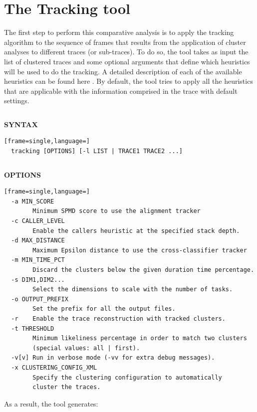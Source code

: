 \documentclass[twoside,a4,english,11pt]{book}
\begin{document}
\section{The Tracking tool}

The first step to perform this comparative analysis is to apply the tracking algorithm to the sequence of 
frames that results from the application of cluster analyses to different traces (or sub-traces).
To do so, the tool takes as input the list of clustered traces and some optional arguments that define
which heuristics will be used to do the tracking. A detailed description of each of the available 
heuristics can be found here \cite{Llort:IPTW14}. By default, the tool tries to apply all the heuristics
that are applicable with the information comprised in the trace with default settings.

\begin{tabular}{c}
 \tabularnewline
\end{tabular}

\textbf{SYNTAX}
\begin{lstlisting}[frame=single,language=]
  tracking [OPTIONS] [-l LIST | TRACE1 TRACE2 ...]
\end{lstlisting}

\begin{tabular}{c}
 \tabularnewline
\end{tabular}

\textbf{OPTIONS}
\begin{lstlisting}[frame=single,language=]
  -a MIN_SCORE
        Minimum SPMD score to use the alignment tracker
  -c CALLER_LEVEL
        Enable the callers heuristic at the specified stack depth.
  -d MAX_DISTANCE
        Maximum Epsilon distance to use the cross-classifier tracker
  -m MIN_TIME_PCT
        Discard the clusters below the given duration time percentage.
  -s DIM1,DIM2...
        Select the dimensions to scale with the number of tasks.
  -o OUTPUT_PREFIX
        Set the prefix for all the output files.
  -r    Enable the trace reconstruction with tracked clusters.
  -t THRESHOLD
        Minimum likeliness percentage in order to match two clusters 
        (special values: all | first).
  -v[v] Run in verbose mode (-vv for extra debug messages).
  -x CLUSTERING_CONFIG_XML
        Specify the clustering configuration to automatically 
        cluster the traces.
\end{lstlisting}

As a result, the tool generates:
\end{document}
